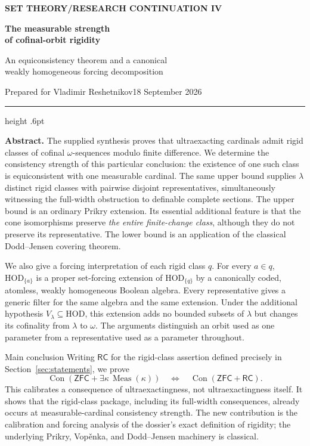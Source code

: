 \documentclass[11pt,letterpaper]{article}
\theoremstyle{definition}
\numberwithin{equation}{section}
\newcommand{\ZFC}{\mathsf{ZFC}}
\newcommand{\HOD}{\mathrm{HOD}}
\newcommand{\Con}{\operatorname{Con}}
\newcommand{\Meas}{\operatorname{Meas}}
\newcommand{\RC}{\mathsf{RC}}
\begin{document}
\thispagestyle{empty}
{\sffamily\bfseries\small\color{Olive}SET THEORY\quad /\quad RESEARCH CONTINUATION IV}

\vspace{13pt}
{\fontsize{28}{31}\selectfont\bfseries\color{Forest}The measurable strength\\ of cofinal-orbit rigidity\par}
\vspace{10pt}
{\fontsize{14}{18}\selectfont An equiconsistency theorem and a canonical\\ weakly homogeneous forcing decomposition\par}
\vspace{14pt}
{\color{Muted}Prepared for Vladimir Reshetnikov\hfill 18 September 2026\par}
\vspace{3pt}
{\color{Sage}\hrule height .6pt}
\vspace{12pt}

\textbf{Abstract.}
The supplied synthesis proves that ultraexacting cardinals admit rigid classes of cofinal
$\omega$-sequences modulo finite difference. We determine the consistency strength of
this particular conclusion: the existence of one such class is equiconsistent with
one measurable cardinal. The same upper bound supplies $\lambda$ distinct rigid classes
with pairwise disjoint representatives, simultaneously witnessing the full-width
obstruction to definable complete sections. The upper bound is an ordinary Prikry
extension. Its essential additional feature is that the cone isomorphisms preserve
\emph{the entire finite-change class}, although they do not preserve its representative.
The lower bound is an application of the classical Dodd--Jensen covering theorem.

We also give a forcing interpretation of each rigid class $q$. For every $a\in q$,
$\HOD_{\{a\}}$ is a proper set-forcing extension of $\HOD_{\{q\}}$ by a canonically
coded, atomless, weakly homogeneous Boolean algebra. Every representative gives a
generic filter for the same algebra and the same extension. Under the additional
hypothesis $V_\lambda\subseteq\HOD$, this extension adds no bounded subsets of
$\lambda$ but changes its cofinality from $\lambda$ to $\omega$. The arguments distinguish
an orbit used as one parameter from a representative used as a parameter throughout.

\begin{assessment}{Main conclusion}
Writing $\RC$ for the rigid-class assertion defined precisely in
Section~\ref{sec:statements}, we prove
\[
 \boxed{\quad
 \Con(\ZFC+\exists\kappa\,\Meas(\kappa))
 \quad\Longleftrightarrow\quad
 \Con(\ZFC+\RC).
 \quad}
\]
This calibrates a consequence of ultraexactingness, not ultraexactingness itself.
It shows that the rigid-class package, including its full-width consequences,
already occurs at measurable-cardinal consistency strength. The new contribution is the
calibration and forcing analysis of the dossier's exact definition of rigidity;
the underlying Prikry, Vop\v enka, and Dodd--Jensen machinery is classical.
\end{assessment}
\end{document}
